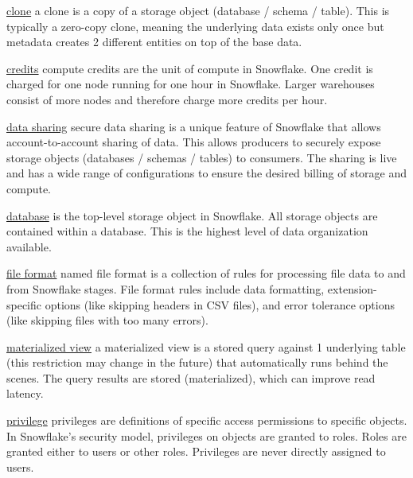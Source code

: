 \documentclass[9pt]{innovativeinnovation-cheatsheet}
\begin{document}
\begin{multicols}{3}
\be{}
      \item \href{https://docs.snowflake.com/en/sql-reference/sql/create-clone.html}{clone}  a clone is a copy of a storage object (database / schema / table). This is typically a zero-copy clone, meaning the underlying data exists only once but metadata creates 2 different entities on top of the base data.

      \item \href{https://docs.snowflake.net/manuals/user-guide/credits.html}{credits}  compute credits are the unit of compute in Snowflake. One credit is charged for one node running for one hour in Snowflake. Larger warehouses consist of more nodes and therefore charge more credits per hour.
      
      \item \href{https://docs.snowflake.net/manuals/user-guide/data-sharing-intro.html}{data sharing}  secure data sharing is a unique feature of Snowflake that allows account-to-account sharing of data. This allows producers to securely expose storage objects (databases / schemas / tables) to consumers. The sharing is live and has a wide range of configurations to ensure the desired billing of storage and compute.
      
      \item \href{https://docs.snowflake.net/manuals/sql-reference/ddl-database.html}{database}  is the top-level storage object in Snowflake. All storage objects are contained within a database. This is the highest level of data organization available.
      
      \item \href{https://docs.snowflake.net/manuals/sql-reference/sql/create-file-format.html}{file format}  named file format is a collection of rules for processing file data to and from Snowflake stages. File format rules include data formatting, extension-specific options (like skipping headers in CSV files), and error tolerance options (like skipping files with too many errors).
      
      \item \href{https://docs.snowflake.net/manuals/user-guide/views-materialized.html}{materialized view}  a materialized view is a stored query against 1 underlying table (this restriction may change in the future) that automatically runs behind the scenes. The query results are stored (materialized), which can improve read latency.
      
      \item \href{https://docs.snowflake.net/manuals/user-guide/security-access-control-overview.html#privileges}{privilege}  privileges are definitions of specific access permissions to specific objects. In Snowflake's security model, privileges on objects are granted to roles. Roles are granted either to users or other roles. Privileges are never directly assigned to users.
      

\end{multicols}
\end{document}

